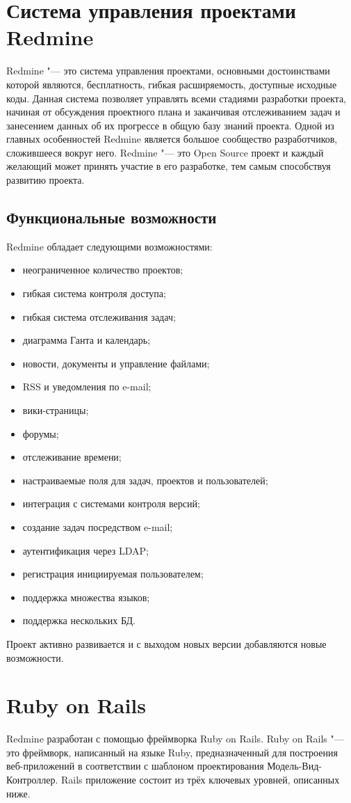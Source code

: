 \section{Система управления проектами Redmine}
Redmine "--- это система управления проектами, основными достоинствами которой
являются, бесплатность, гибкая расширяемость, доступные исходные коды.
Данная система позволяет управлять всеми стадиями разработки проекта, начиная
от обсуждения проектного плана и заканчивая отслеживанием задач и занесением
данных об их прогрессе в общую базу знаний проекта. Одной из главных
особенностей Redmine является большое сообщество разработчиков, сложившееся
вокруг него. Redmine "--- это Open Source проект и каждый желающий может принять
участие в его разработке, тем самым способствуя развитию проекта.

\subsection{Функциональные возможности}
Redmine обладает следующими возможностями:
\begin{itemize}
  \item неограниченное количество проектов;
  \item гибкая система контроля доступа;
  \item гибкая система отслеживания задач;
  \item диаграмма Ганта и календарь;
  \item новости, документы и управление файлами;
  \item RSS и уведомления по e-mail;
  \item вики-страницы;
  \item форумы;
  \item отслеживание времени;
  \item настраиваемые поля для задач, проектов и пользователей;
  \item интеграция с системами контроля версий;
  \item создание задач посредством e-mail;
  \item аутентификация через LDAP;
  \item регистрация инициируемая пользователем;
  \item поддержка множества языков;
  \item поддержка нескольких БД.
\end{itemize}
Проект активно развивается и с выходом новых версии добавляются новые
возможности.

\section{Ruby on Rails}
Redmine разработан с помощью фреймворка Ruby on Rails. Ruby on Rails "--- это
фреймворк, написанный на языке Ruby, предназначенный для построения
веб-приложений в соответствии с шаблоном проектирования Модель-Вид-Контроллер.
Rails приложение состоит из трёх ключевых уровней, описанных ниже.

